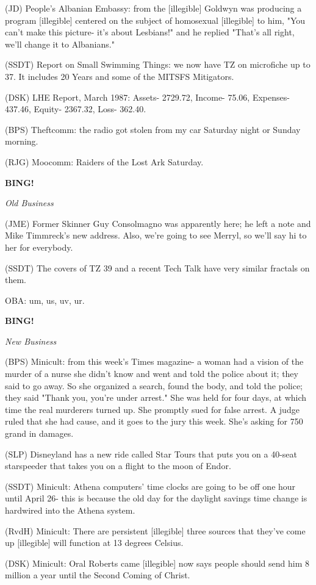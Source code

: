 \documentclass[12pt]{article}
\newcommand{\bing}{{\bf BING!} }
\newcommand{\goto}[1]{\bing \vskip 12pt \centerline{{\em{#1}}}}
\begin{document}
(JD) People's Albanian Embassy: from the [illegible] Goldwyn was producing a program [illegible] centered on the subject of homosexual [illegible] to him, "You can't make this picture- it's about Lesbians!" and he replied "That's all right, we'll change it to Albanians."

(SSDT) Report on Small Swimming Things: we now have TZ on microfiche up to 37. It includes 20 Years and some of the MITSFS Mitigators.

(DSK) LHE Report, March 1987: Assets- 2729.72, Income- 75.06, Expenses- 437.46, Equity- 2367.32, Loss- 362.40.

(BPS) Theftcomm: the radio got stolen from my car Saturday night or Sunday morning.

(RJG) Moocomm: Raiders of the Lost Ark Saturday.

\goto{Old Business}

(JME) Former Skinner Guy Consolmagno was apparently here; he left a note and Mike Timmreck's new address. Also, we're going to see Merryl, so we'll say hi to her for everybody.

(SSDT) The covers of TZ 39 and a recent Tech Talk have very similar fractals on them.

OBA: um, us, uv, ur.

\goto{New Business}

(BPS) Minicult: from this week's Times magazine- a woman had a vision of the murder of a nurse she didn't know and went and told the police about it; they said to go away. So she organized a search, found the body, and told the police; they said "Thank you, you're under arrest." She was held for four days, at which time the real murderers turned up. She promptly sued for false arrest. A judge ruled that she had cause, and it goes to the jury this week. She's asking for 750 grand in damages.

(SLP) Disneyland has a new ride called Star Tours that puts you on a 40-seat starspeeder that takes you on a flight to the moon of Endor.

(SSDT) Minicult: Athena computers' time clocks are going to be off one hour until April 26- this is because the old day for the daylight savings time change is hardwired into the Athena system.

(RvdH) Minicult: There are persistent [illegible] three sources that they've come up [illegible] will function at 13 degrees Celsius.

(DSK) Minicult: Oral Roberts came [illegible] now says people should send him 8 million a year until the Second Coming of Christ.
\end{document}
